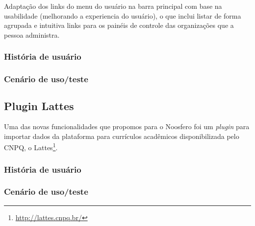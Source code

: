 Adaptação dos links do menu do usuário na barra principal com base na usabilidade (melhorando a experiencia do usuário), o que inclui listar de forma agrupada e intuitiva links para os painéis de controle das organizações que a pessoa administra.

\subsubsection*{História de usuário}

\subsubsection*{Cenário de uso/teste}

\subsection{Plugin Lattes}

Uma das novas funcionalidades que propomos para o Noosfero foi um \textit{plugin}
para importar dados da plataforma para currículos acadêmicos disponibilizada
pelo CNPQ, o Lattes\footnote{\url{http://lattes.cnpq.br/}}.

\subsubsection*{História de usuário}

\subsubsection*{Cenário de uso/teste}
